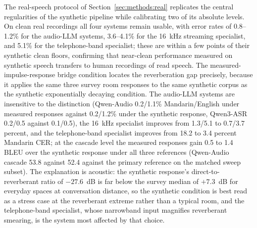 The real-speech protocol of Section~\ref{sec:methods:real} replicates the
central regularities of the synthetic pipeline while calibrating two of
its absolute levels. On clean real recordings all four systems remain
usable, with error rates of 0.8--1.2\% for the audio-LLM systems, 3.6--4.1\%
for the 16~kHz streaming specialist, and 5.1\% for the telephone-band
specialist; these are within a few points of their synthetic clean floors,
confirming that near-clean performance measured on synthetic speech
transfers to human recordings of read speech. The measured-impulse-response
bridge condition locates the reverberation gap precisely, because it
applies the same three survey room responses to the same synthetic corpus
as the synthetic exponentially decaying condition. The audio-LLM systems
are insensitive to the distinction (Qwen-Audio 0.2/1.1\%
Mandarin/English under measured responses against 0.2/1.2\% under the
synthetic response, Qwen3-ASR 0.2/0.5 against 0.1/0.5), the 16~kHz
specialist improves from 1.3/5.1 to 0.7/3.7 percent, and the telephone-band
specialist improves from 18.2 to 3.4 percent Mandarin CER; at the cascade
level the measured responses gain 0.5 to 1.4 BLEU over the synthetic
response under all three references (Qwen-Audio cascade 53.8 against 52.4
against the primary reference on the matched sweep subset). The
explanation is acoustic: the synthetic response's direct-to-reverberant
ratio of $-27.6$~dB is far below the survey median of $+7.3$~dB for
everyday spaces at conversation distance, so the synthetic condition is
best read as a stress case at the reverberant extreme rather than a typical
room, and the telephone-band specialist, whose narrowband input magnifies
reverberant smearing, is the system most affected by that choice.


